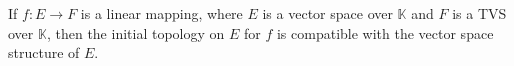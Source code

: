 If $f: E \to F$ is a linear mapping, where $E$ is a vector space over $\mathbb{K}$ and $F$ is a TVS over $\mathbb{K}$, then the initial topology on $E$ for $f$ is compatible with the vector space structure of $E$.
